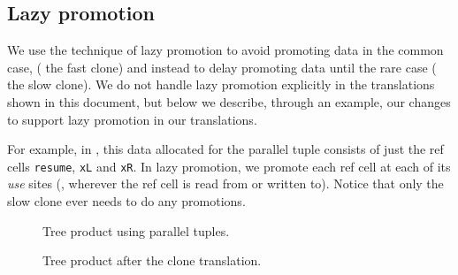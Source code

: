 \documentclass[11pt]{article}
\begin{document}
\subsection{Lazy promotion}
We use the technique of lazy promotion to avoid promoting data in the common case,
(\eg{} the fast clone) and instead to delay promoting data until the rare
case (\eg{} the slow clone).
We do not handle lazy promotion explicitly in the translations shown in this document,
but below we describe, through an example, our changes to support lazy promotion
in our translations.

For example, in , this data allocated for the parallel tuple 
consists of just the ref cells \texttt{resume}, \texttt{xL} and \texttt{xR}.
In lazy promotion, we promote each ref cell at each of its \emph{use} sites (\eg{}, wherever
the ref cell is read from or written to).
Notice that only the slow clone ever needs to do any promotions.

\begin{figure}
  
  \caption{Tree product using parallel tuples.}
  \label{fig:tree-prod-ptup}
\end{figure}

\begin{figure}
  
  \caption{Tree product after the clone translation.}
  \label{fig:tree-prod-clone}
\end{figure}
\end{document}
